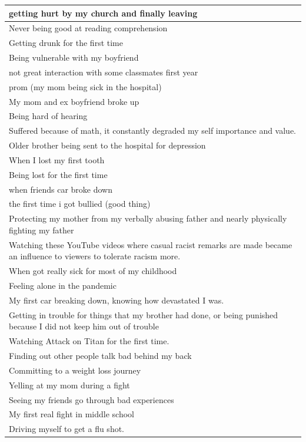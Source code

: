 \documentclass[
  .7em,
  letterpaper,
  DIV=11,
  numbers=noendperiod]{scrartcl}
\begin{document}
\begin{table}
\begin{tabular}{l}
\hline
getting hurt by my church and finally leaving\\
\hline
Never being good at reading comprehension\\
\hline
Getting drunk for the first time\\
\hline
Being vulnerable with my boyfriend\\
\hline
not great interaction with some classmates first year\\
\hline
prom (my mom being sick in the hospital)\\
\hline
My mom and ex boyfriend broke up\\
\hline
Being hard of hearing\\
\hline
Suffered because of math, it constantly degraded my self importance and value.\\
\hline
Older brother being sent to the hospital for depression\\
\hline
When I lost my first tooth\\
\hline
Being lost for the first time\\
\hline
when friends car  broke down\\
\hline
the first time i got bullied (good thing)\\
\hline
Protecting my mother from my verbally abusing father and nearly physically fighting my father\\
\hline
Watching these YouTube videos where casual racist remarks are made became an influence to viewers to tolerate racism more.\\
\hline
When got really sick for most of my childhood\\
\hline
Feeling alone in the pandemic\\
\hline
My first car breaking down, knowing how devastated I was.\\
\hline
Getting in trouble for things that my brother had done, or being punished because I did not keep him out of trouble\\
\hline
Watching Attack on Titan for the first time.\\
\hline
Finding out other people talk bad behind my back\\
\hline
Committing to a weight loss journey\\
\hline
Yelling at my mom during a fight\\
\hline
Seeing my friends go through bad experiences\\
\hline
My first real fight in middle school\\
\hline
Driving myself to get a flu shot.\\

\end{tabular}
\end{table}
\end{document}
